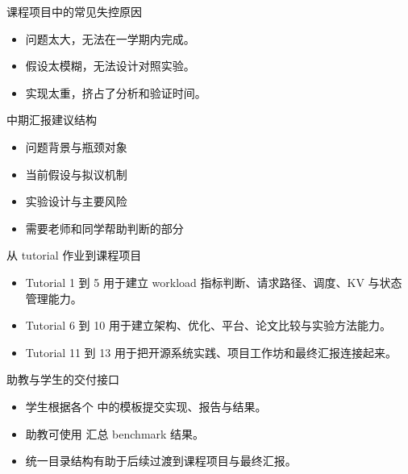 \begin{frame}{课程项目中的常见失控原因}
  \begin{itemize}
    \item 问题太大，无法在一学期内完成。
    \item 假设太模糊，无法设计对照实验。
    \item 实现太重，挤占了分析和验证时间。
  \end{itemize}
\end{frame}

\begin{frame}{中期汇报建议结构}
  \begin{itemize}
    \item 问题背景与瓶颈对象
    \item 当前假设与拟议机制
    \item 实验设计与主要风险
    \item 需要老师和同学帮助判断的部分
  \end{itemize}
\end{frame}

\begin{frame}{从 tutorial 作业到课程项目}
  \begin{itemize}
    \item Tutorial 1 到 5 用于建立 workload 指标判断、请求路径、调度、KV 与状态管理能力。
    \item Tutorial 6 到 10 用于建立架构、优化、平台、论文比较与实验方法能力。
    \item Tutorial 11 到 13 用于把开源系统实践、项目工作坊和最终汇报连接起来。
  \end{itemize}
\end{frame}

\begin{frame}{助教与学生的交付接口}
  \begin{itemize}
    \item 学生根据各个 \texttt{} 中的模板提交实现、报告与结果。
    \item 助教可使用 \texttt{} 汇总 benchmark 结果。
    \item 统一目录结构有助于后续过渡到课程项目与最终汇报。
  \end{itemize}
\end{frame}

